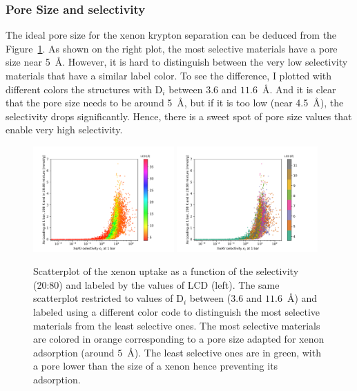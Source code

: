 \documentclass[main.tex]{subfiles}
\begin{document}
\subsubsection{Pore Size and selectivity}

The ideal pore size for the xenon krypton separation can be deduced from the Figure~\ref{fgr:lcd}. As shown on the right plot, the most selective materials have a pore size near \SI{5}{\angstrom}. However, it is hard to distinguish between the very low selectivity materials that have a similar label color. To see the difference, I plotted with different colors the structures with D$_i$ between $3.6$ and $11.6$~\si{\angstrom}. And it is clear that the pore size needs to be around \SI{5}{\angstrom}, but if it is too low (near \SI{4.5}{\angstrom}), the selectivity drops significantly. Hence, there is a sweet spot of pore size values that enable very high selectivity.

\begin{figure}[ht!]
  \centering
  \includegraphics[width=0.48\textwidth]{figures/2-thermo/Scatterplot_uptake_selectivity_lcd.pdf}
  \includegraphics[width=0.48\textwidth]{figures/2-thermo/Scatterplot_uptake_selectivity_lcd_zoom.pdf}
  \caption{Scatterplot of the xenon uptake as a function of the selectivity (20:80) and labeled by the values of LCD (left). The same scatterplot restricted to values of D$_i$ between ($3.6$ and $11.6$~\si{\angstrom}) and labeled using a different color code to distinguish the most selective materials from the least selective ones. The most selective materials are colored in orange corresponding to a pore size adapted for xenon adsorption (around $5$~\si{\angstrom}). The least selective ones are in green, with a pore lower than the size of a xenon hence preventing its adsorption.}\label{fgr:lcd}
\end{figure}
\end{document}
